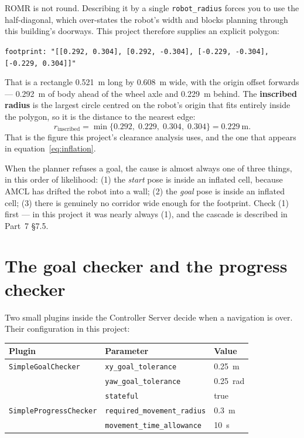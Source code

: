 \documentclass[11pt,a4paper]{report}
\newcommand{\term}[1]{\textcolor{rust}{\textbf{#1}}}
\newcommand{\file}[1]{\texttt{\small #1}}
\begin{document}
ROMR is not round. Describing it by a single \file{robot\_radius} forces you to
use the half-diagonal, which over-states the robot's width and blocks planning
through this building's doorways. This project therefore supplies an explicit
polygon:
\begin{center}
\file{footprint: "[[0.292, 0.304], [0.292, -0.304], [-0.229, -0.304], [-0.229, 0.304]]"}
\end{center}
That is a rectangle \SI{0.521}{\metre} long by \SI{0.608}{\metre} wide, with
the origin offset forwards --- \SI{0.292}{\metre} of body ahead of the wheel
axle and \SI{0.229}{\metre} behind. The \term{inscribed radius} is the largest
circle centred on the robot's origin that fits entirely inside the polygon, so
it is the distance to the nearest edge:
\[
r_{\text{inscribed}} = \min\{0.292,\; 0.229,\; 0.304,\; 0.304\} = \SI{0.229}{\metre}.
\]
That is the figure this project's clearance analysis uses, and the one that
appears in equation~\eqref{eq:inflation}.

\begin{keyidea}
When the planner refuses a goal, the cause is almost always one of three
things, in this order of likelihood: (1) the \emph{start} pose is inside an
inflated cell, because AMCL has drifted the robot into a wall; (2) the
\emph{goal} pose is inside an inflated cell; (3) there is genuinely no
corridor wide enough for the footprint. Check (1) first --- in this project it
was nearly always (1), and the cascade is described in Part~7 \S7.5.
\end{keyidea}

\section{The goal checker and the progress checker}
\label{sec:checkers}

Two small plugins inside the Controller Server decide when a navigation is
over. Their configuration in this project:

\begin{center}
\begin{tabular}{@{}lll@{}}
\toprule
\textbf{Plugin} & \textbf{Parameter} & \textbf{Value} \\
\midrule
\file{SimpleGoalChecker}     & \file{xy\_goal\_tolerance}      & \SI{0.25}{\metre} \\
                             & \file{yaw\_goal\_tolerance}     & \SI{0.25}{\radian} \\
                             & \file{stateful}                 & true \\
\midrule
\file{SimpleProgressChecker} & \file{required\_movement\_radius}& \SI{0.3}{\metre} \\
                             & \file{movement\_time\_allowance}& \SI{10}{\second} \\
\bottomrule
\end{tabular}
\end{center}
\end{document}
